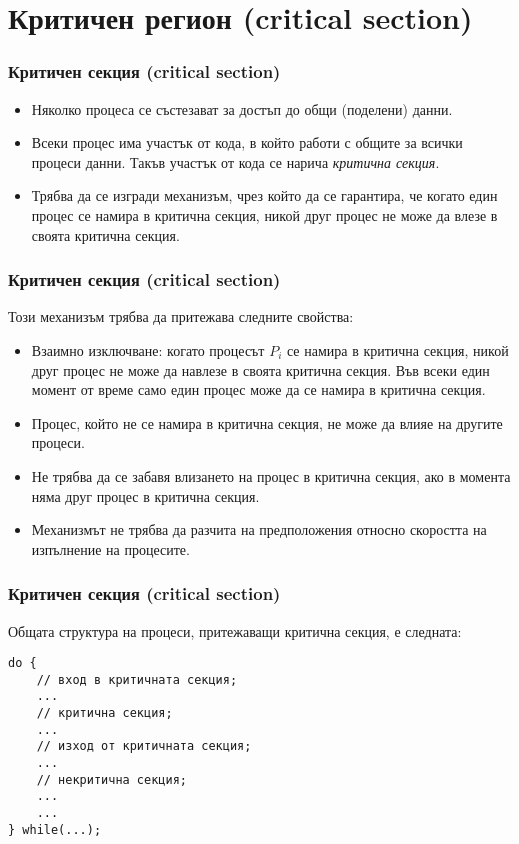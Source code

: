\documentclass[ignorenonframetext, hyperref=unicode]{beamer}
\begin{document}
\section{Критичен регион (critical section)}

\begin{frame}[containsverbatim]
\frametitle{Критичен секция (critical section)}
\begin{itemize}
  \item Няколко процеса се състезават за достъп до общи (поделени) данни.
  \item Всеки процес има участък от кода, в който работи с общите за всички процеси
  данни. Такъв участък от кода се нарича {\em критична секция}.
  \item Трябва да се изгради механизъм, чрез който да се гарантира, че когато
  един процес се намира в критична секция, никой друг процес не може да
  влезе в своята критична секция.
\end{itemize}
\end{frame}



\begin{frame}[containsverbatim]
\frametitle{Критичен секция (critical section)}
Този механизъм трябва да притежава следните свойства:
  \begin{itemize}
    \item Взаимно изключване: когато процесът $P_i$ се намира в критична секция,
    никой друг процес не може да навлезе в своята критична секция. Във всеки
    един момент от време само един процес може да се намира в критична секция.
    \item Процес, който не се намира в критична секция, не може да влияе на
    другите процеси.
    \item Не трябва да се забавя влизането на процес в критична секция, ако в
    момента няма друг процес в критична секция.
    \item Механизмът не трябва да разчита на предположения относно скоростта на
    изпълнение на процесите.
  \end{itemize}
\end{frame}

\begin{frame}[containsverbatim]
\frametitle{Критичен секция (critical section)}
Общата структура на процеси, притежаващи критична секция, е следната:
\begin{lstlisting}
do {
	// вход в критичната секция;
	...
	// критична секция;
	...
	// изход от критичната секция;
	...
	// некритична секция;
	...
	...
} while(...);
\end{lstlisting}
\end{frame}
\end{document}
